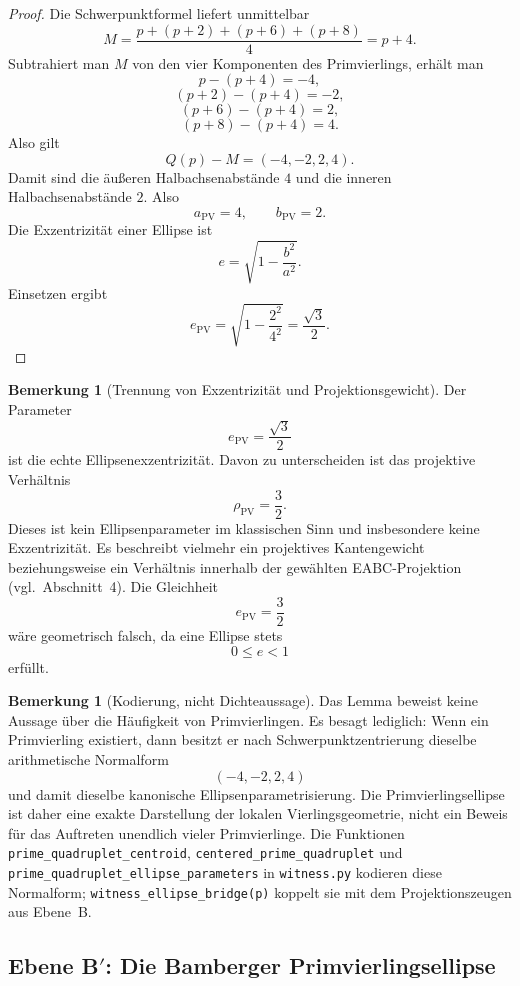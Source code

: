 \documentclass[11pt,a4paper]{article}
\theoremstyle{definition}
\newtheorem{bemerkung}[definition]{Bemerkung}
\theoremstyle{plain}
\newcommand{\rhoPV}{\rho_{\mathrm{PV}}}
\begin{document}
	\begin{proof}
		Die Schwerpunktformel liefert unmittelbar
		\[
		M=\frac{p+(p+2)+(p+6)+(p+8)}{4}=p+4.
		\]
		Subtrahiert man $M$ von den vier Komponenten des Primvierlings, erhält man
		\[
		p-(p+4)=-4,
		\]
		\[
		(p+2)-(p+4)=-2,
		\]
		\[
		(p+6)-(p+4)=2,
		\]
		\[
		(p+8)-(p+4)=4.
		\]
		Also gilt
		\[
		Q(p)-M=(-4,-2,2,4).
		\]
		Damit sind die äußeren Halbachsenabstände $4$ und die inneren Halbachsenabstände $2$. Also
		\[
		a_{\mathrm{PV}}=4,
		\qquad
		b_{\mathrm{PV}}=2.
		\]
		Die Exzentrizität einer Ellipse ist
		\[
		e=\sqrt{1-\frac{b^2}{a^2}}.
		\]
		Einsetzen ergibt
		\[
		e_{\mathrm{PV}}
		=
		\sqrt{1-\frac{2^2}{4^2}}
		=
		\frac{\sqrt3}{2}.
		\]
	\end{proof}
	
	\begin{bemerkung}[Trennung von Exzentrizität und Projektionsgewicht]\label{bem:e-vs-rho}
		Der Parameter
		\[
		e_{\mathrm{PV}}=\frac{\sqrt3}{2}
		\]
		ist die echte Ellipsenexzentrizität.
		Davon zu unterscheiden ist das projektive Verhältnis
		\[
		\rhoPV=\frac32.
		\]
		Dieses ist kein Ellipsenparameter im klassischen Sinn und insbesondere keine Exzentrizität. Es beschreibt vielmehr ein projektives Kantengewicht beziehungsweise ein Verhältnis innerhalb der gewählten EABC-Projektion (vgl.\ Abschnitt~4).
		Die Gleichheit
		\[
		e_{\mathrm{PV}}=\frac32
		\]
		wäre geometrisch falsch, da eine Ellipse stets
		\[
		0\leq e<1
		\]
		erfüllt.
	\end{bemerkung}
	
	\begin{bemerkung}[Kodierung, nicht Dichteaussage]\label{bem:ellipse-nodensity}
		Das Lemma beweist keine Aussage über die Häufigkeit von Primvierlingen. Es besagt lediglich:
		Wenn ein Primvierling existiert, dann besitzt er nach Schwerpunktzentrierung dieselbe arithmetische Normalform
		\[
		(-4,-2,2,4)
		\]
		und damit dieselbe kanonische Ellipsenparametrisierung.
		Die Primvierlingsellipse ist daher eine exakte Darstellung der lokalen Vierlingsgeometrie, nicht ein Beweis für das Auftreten unendlich vieler Primvierlinge.
		Die Funktionen \texttt{prime\_quadruplet\_centroid}, \texttt{centered\_prime\_quadruplet} und \texttt{prime\_quadruplet\_ellipse\_parameters} in \texttt{witness.py} kodieren diese Normalform; \texttt{witness\_ellipse\_bridge(p)} koppelt sie mit dem Projektionszeugen aus Ebene~B.
	\end{bemerkung}
	
	\subsection{Ebene B$'$: Die Bamberger Primvierlingsellipse}
	
\end{document}
